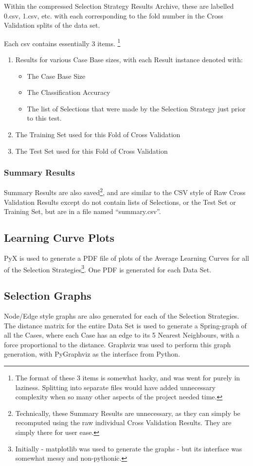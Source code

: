 \documentclass[a4paper,11pt]{report}
\begin{document}
Within the compressed Selection Strategy Results Archive, these are labelled 0.csv, 1.csv, etc. with each corresponding to the fold number in the Cross Validation splits of the data set.

Each csv contains essentially 3 items. \footnote{The format of these 3 items is somewhat hacky, and was went for purely in laziness. Splitting into separate files would have added unnecessary complexity when so many other aspects of the project needed time.}

\begin{enumerate}
	\item Results for various Case Base sizes, with each Result instance denoted with:
		\begin{itemize}
			\item The Case Base Size
			\item The Classification Accuracy
			\item The list of Selections that were made by the Selection Strategy just prior to this test.
		\end{itemize}
	\item The Training Set used for this Fold of Cross Validation
	\item The Test Set used for this Fold of Cross Validation
\end{enumerate}

\subsubsection{Summary Results}
Summary Results are also saved\footnote{Technically, these Summary Results are unnecessary, as they can simply be recomputed using the raw individual Cross Validation Results. They are simply there for user ease.}, and are similar to the CSV style of Raw Cross Validation Results except do not contain lists of Selections, or the Test Set or Training Set, but are in a file named ``summary.csv''.

\subsection{Learning Curve Plots}
PyX\citep{prog:pyx} is used to generate a PDF file of plots of the Average Learning Curves for all of the Selection Strategies\footnote{Initially - matplotlib\citep{prog:matplotlib} was used to generate the graphs - but its interface was somewhat messy and non-pythonic.}. One PDF is generated for each Data Set.

\subsection{Selection Graphs}
Node/Edge style graphs are also generated for each of the Selection Strategies. The distance matrix for the entire Data Set is used to generate a Spring-graph of all the Cases, where each Case has an edge to its 5 Nearest Neighbours, with a force proportional to the distance. Graphviz\citep{prog:graphviz} was used to perform this graph generation, with PyGraphviz\citep{prog:pygraphviz} as the interface from Python.
\end{document}
